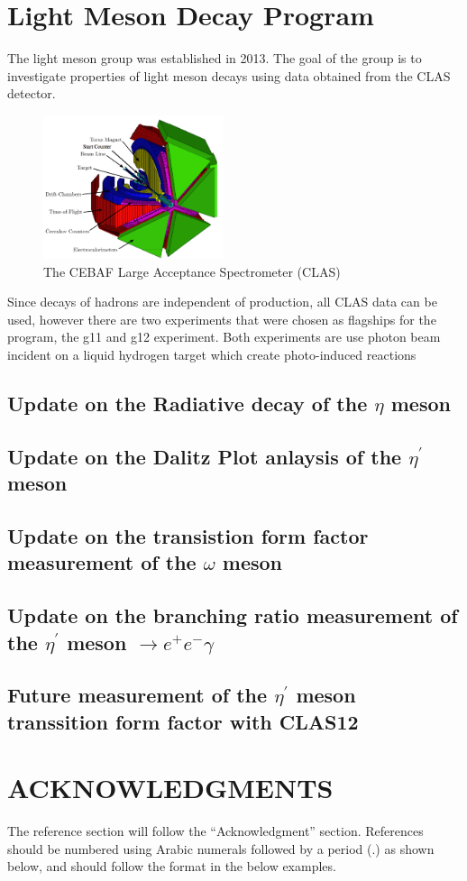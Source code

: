 \documentclass{aip-cp}
\begin{document}
\section{Light Meson Decay Program}
The light meson group was established in 2013. The goal of the group is to investigate properties of light meson decays using data obtained from the CLAS detector.
\begin{figure}[h]
	\centerline{\includegraphics[width=150pt]{figures/clas_schematicIII.pdf}}
	\caption{The CEBAF Large Acceptance Spectrometer (CLAS) }
\end{figure}
 Since decays of hadrons are independent of production, all CLAS data can be used, however there are two experiments that were chosen as flagships for the program, the g11 and g12 experiment. Both experiments are use photon beam incident on a liquid hydrogen target which create photo-induced reactions 

\subsection{Update on the Radiative decay of the $\eta$ meson}

\subsection{Update on the Dalitz Plot anlaysis of the $\eta^\prime$ meson}

\subsection{Update on the transistion form factor measurement  of the $\omega$ meson}

\subsection{Update on the branching ratio measurement  of the $\eta^\prime$ meson $\rightarrow e^+e^-\gamma$}
\subsection{Future measurement of the $\eta^\prime$ meson transsition form factor with CLAS12}

\section{ACKNOWLEDGMENTS}
The reference section will follow the ``Acknowledgment'' section.  References should be numbered using Arabic numerals followed by a period (.) as shown below, and should follow the format in the below examples.


\nocite{*}
%
%
\end{document}
